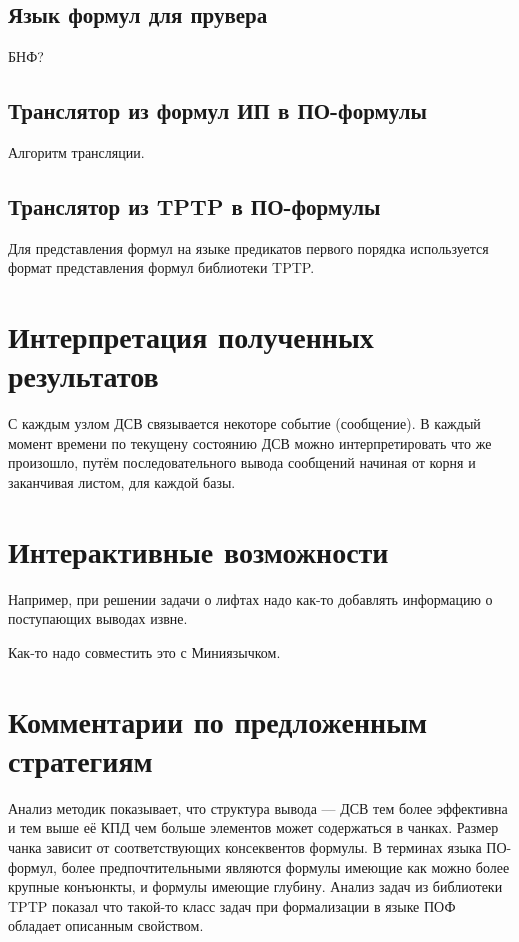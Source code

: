 \subsection{Язык формул для прувера}
БНФ?

\subsection{Транслятор из формул ИП в ПО-формулы}
Алгоритм трансляции. 

\subsection{Транслятор из TPTP в ПО-формулы}
Для представления формул на языке предикатов первого порядка используется формат представления формул библиотеки TPTP.

\section{Интерпретация полученных результатов}
С каждым узлом ДСВ связывается некоторе событие (сообщение). В каждый момент времени по текущену состоянию ДСВ можно интерпретировать что же произошло, путём последовательного вывода сообщений начиная от корня и заканчивая листом, для каждой базы.


\section{Интерактивные возможности}
Например, при решении задачи о лифтах надо как-то добавлять информацию о поступающих выводах извне.

Как-то надо совместить это с Миниязычком.

\section{Комментарии по предложенным стратегиям}
Анализ методик показывает, что структура вывода --- ДСВ тем более эффективна и тем выше её КПД чем больше элементов может содержаться в чанках. Размер чанка зависит от соответствующих консеквентов формулы. В терминах языка ПО-формул, более предпочтительными являются формулы имеющие как можно более крупные конъюнкты, и формулы имеющие глубину. Анализ задач из библиотеки TPTP показал что такой-то класс задач при формализации в языке ПОФ обладает описанным свойством.

